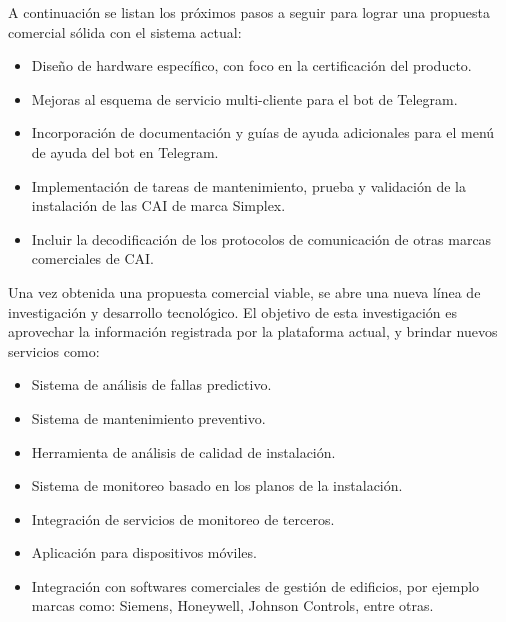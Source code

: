 A continuación se listan los próximos pasos a seguir para lograr una propuesta comercial sólida con el sistema actual:
\begin{itemize}
\item Diseño de hardware específico, con foco en la certificación del producto.
\item Mejoras al esquema de servicio multi-cliente para el bot de Telegram.
\item Incorporación de documentación y guías de ayuda adicionales para el menú de ayuda del bot en Telegram.
\item Implementación de tareas de mantenimiento, prueba y validación de la instalación de las CAI de marca Simplex.
\item Incluir la decodificación de los protocolos de comunicación de otras marcas comerciales de CAI.
\end{itemize}

Una vez obtenida una propuesta comercial viable, se abre una nueva línea de investigación y desarrollo tecnológico. El objetivo de esta investigación es aprovechar la información registrada por la plataforma actual, y brindar nuevos servicios como:
\begin{itemize}
\item Sistema de análisis de fallas predictivo.
\item Sistema de mantenimiento preventivo.
\item Herramienta de análisis de calidad de instalación.
\item Sistema de monitoreo basado en los planos de la instalación.
\item Integración de servicios de monitoreo de terceros.
\item Aplicación para dispositivos móviles.
\item Integración con softwares comerciales de gestión de edificios, por ejemplo marcas como: Siemens, Honeywell, Johnson Controls, entre otras.
\end{itemize}
